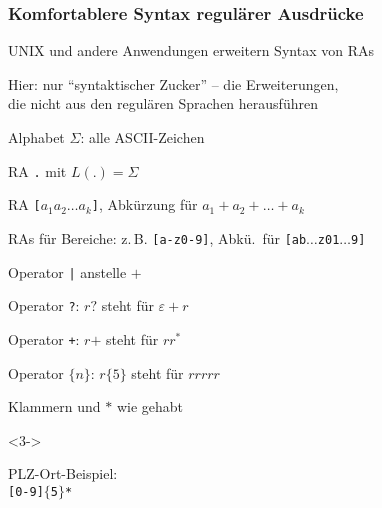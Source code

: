    \begin{frame}
      \frametitle{Komfortablere Syntax regulärer Ausdrücke}
      
      \begin{Itemize}
        \item
          UNIX und andere Anwendungen erweitern Syntax von RAs
        \item
          Hier: nur "`syntaktischer Zucker"' -- die Erweiterungen,\\
          die nicht aus den regulären Sprachen herausführen
      \end{Itemize}
      
      \par\bigskip
      \begin{Itemize}
        \item<2->
          Alphabet $\Sigma$: alle ASCII-Zeichen
        \item<2->
          RA \texttt{.} mit $L(\texttt{.}) = \Sigma$
        \item<2->
          RA \texttt{[}$a_1a_2\dots a_k$\texttt{]}, Abkürzung für $a_1 + a_2 + \dots + a_k$
        \item<2->
          RAs für Bereiche:
          z.\,B. \texttt{[a-z0-9]}, Abkü.\ für \texttt{[ab$\dots$z01$\dots$9]}
        \item<2->
          Operator \texttt{|} anstelle $+$
        \item<2->
          Operator \texttt{?}: $r\texttt{?}$ steht für $\varepsilon + r$
        \item<2->
          Operator \texttt{+}: $r\texttt{+}$ steht für $rr^*$
        \item<2->
          Operator $\{n\}$: $r\{5\}$ steht für $rrrrr$
        \item<2->
          Klammern und $*$ wie gehabt
      \end{Itemize}
      
      \vspace*{-3\baselineskip}%
      \hspace*{.655\textwidth}%
      \begin{minipage}{.345\textwidth}
        \begin{exampleblock}<3->{}
          \begin{small}
            PLZ-Ort-Beispiel: \\
            \texttt{[0-9]$\{$5$\}$\textvisiblespace[A-Z][a-z]*}
            \par
          \end{small}
         \end{exampleblock}
     \end{minipage}
    \end{frame}

